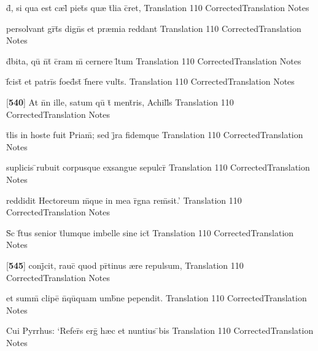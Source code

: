 \latline
  {d\={\macron {\i}}, si qua est c{\ae}l\={} piet\={}s qu{\ae} t\={}lia c\={}ret,}
  { Translation }
  {110}
  { CorrectedTranslation }
  { Notes }


\latline
  {persolvant gr\={}t\={}s dign\={}s et pr{\ae}mia reddant}
  { Translation }
  {110}
  { CorrectedTranslation }
  { Notes }


\latline
  {d\={}bita, qu\={\macron {\i}} n\={}t\={\macron {\i}} c\={}ram m\={} cernere l\={}tum}
  { Translation }
  {110}
  { CorrectedTranslation }
  { Notes }


\latline
  {f\={}cist\={\macron {\i}} et patri\={}s foed\={}st\={\macron {\i}} f\={}nere vult\={}s.}
  { Translation }
  {110}
  { CorrectedTranslation }
  { Notes }


\latline
  {[\textbf{540}] At n\={}n ille, satum qu\={} t\={} ment\={\macron {\i}}ris, Achill\={}s}
  { Translation }
  {110}
  { CorrectedTranslation }
  { Notes }


\latline
  {t\={}lis in hoste fuit Priam\={}; sed j\={}ra fidemque}
  { Translation }
  {110}
  { CorrectedTranslation }
  { Notes }


\latline
  {suplicis \={}rubuit corpusque exsangue sepulcr\={}}
  { Translation }
  {110}
  { CorrectedTranslation }
  { Notes }


\latline
  {reddidit Hectoreum m\={}que in mea r\={}gna rem\={\macron {\i}}sit.'}
  { Translation }
  {110}
  { CorrectedTranslation }
  { Notes }


\latline
  {S\={\macron {\i}}c f\={}tus senior t\={}lumque imbelle sine ict\={}}
  { Translation }
  {110}
  { CorrectedTranslation }
  { Notes }


\latline
  {[\textbf{545}] conj\={}cit, rauc\={} quod pr\={}tinus {\ae}re repulsum,}
  { Translation }
  {110}
  { CorrectedTranslation }
  { Notes }


\latline
  {et summ\={} clipe\={\macron {\i}} n\={}qu\={\macron {\i}}quam umb\={}ne pependit.}
  { Translation }
  {110}
  { CorrectedTranslation }
  { Notes }


\latline
  {Cui Pyrrhus: `Refer\={}s erg\={} h{\ae}c et nuntius \={\macron {\i}}bis}
  { Translation }
  {110}
  { CorrectedTranslation }
  { Notes }


